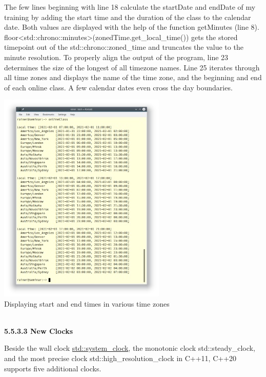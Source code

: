 The few lines beginning with line 18 calculate the startDate and endDate of my training by adding the start time and the duration of the class to the calendar date. Both values are displayed with the help of the function getMinutes (line 8). floor<std::chrono::minutes>(zonedTime.get\_local\_time()) gets the stored timepoint out of the std::chrono::zoned\_time and truncates the value to the minute resolution. To properly align the output of the program, line 23 determines the size of the longest of all timezone names. Line 25 iterates through all time zones and displays the name of the time zone, and the beginning and end of each online class. A few calendar dates even cross the day boundaries.

\begin{center}
\includegraphics[width=0.6\textwidth]{content/3/chapter5/images/28.png}\\
Displaying start and end times in various time zones
\end{center}


\hspace*{\fill} \\ %
\noindent
\textbf{5.5.3.3\hspace{0.2cm} New Clocks}

Beside the wall clock \href{https://www.modernescpp.com/index.php/the-three-clocks}{std::system\_clock}, the monotonic clock std::steady\_clock, and the most precise clock std::high\_resolution\_clock in C++11, C++20 supports five additional clocks.

